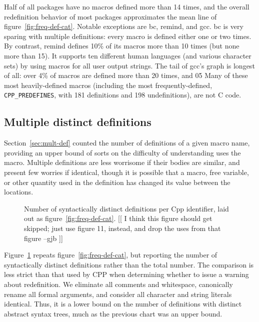 \documentclass[10pt]{article}
\newcommand{\pkg}[1]{\textsf{#1}}
\begin{document}
Half of all packages have no macros defined more than 14 times, and the
overall redefinition behavior of most packages approximates the mean line
of figure~\ref{fig:freq-def-cat}.  Notable exceptions are \pkg{bc},
\pkg{remind}, and \pkg{gcc}.  \pkg{bc} is very sparing with multiple
definitions: every macro is defined either one or two times.  By contrast, 
\pkg{remind} defines 10\% of its macros more than 10 times (but none more
than 15).  It supports ten different human languages (and various character
sets) by using macros for all user output strings.
The tail of \pkg{gcc}'s graph is longest of all:  over 4\% of macros are
defined more than 20 times, and 0\.5%
Many of these most heavily-defined macros (including the most
frequently-defined, \verb|CPP_PREDEFINES|, with  181 definitions and 198
undefinitions), are not C code.



        

\subsection{Multiple distinct definitions}

Section~\ref{sec:mult-def} counted the number of definitions of a given
macro name, providing an upper bound of sorts on the difficulty of
understanding uses the macro.  Multiple definitions are less worrisome if
their bodies are similar, and present few worries if identical, though it
is possible that a macro, free variable, or other quantity used in the
definition has changed its value between the locations.

\begin{figure}
  \centerline{}
  \caption{Number of syntactically distinct definitions per Cpp identifier,
    laid out as figure~\ref{fig:freq-def-cat}. [[ I think this figure
    should get skipped; just use figure 11, instead, and drop the uses
    from that figure --gjb ]]}
  \label{fig:freq-ddf-cat}
\end{figure}
        
Figure~\ref{fig:freq-ddf-cat} repeats figure~\ref{fig:freq-def-cat}, but
reporting the number of syntactically distinct definitions rather than the
total number.  The comparison is less strict than that used by CPP when
determining whether to issue a warning about redefinition.  We eliminate
all comments and whitespace, canonically rename all formal arguments, and
consider all character and string literals identical.  Thus, it is a lower
bound on the number of definitions with distinct abstract syntax trees,
much as the previous chart was an upper bound.
\end{document}
